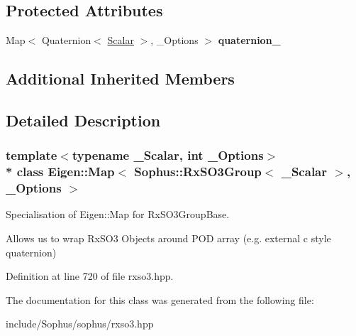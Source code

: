 \subsection*{Protected Attributes}
\begin{DoxyCompactItemize}
\item 
Map$<$ Quaternion$<$ \hyperlink{class_eigen_1_1_map_3_01_sophus_1_1_rx_s_o3_group_3_01___scalar_01_4_00_01___options_01_4_a7810f1290abcedb01ffc558ddef2484f}{Scalar} $>$, \+\_\+\+Options $>$ {\bfseries quaternion\+\_\+}\hypertarget{class_eigen_1_1_map_3_01_sophus_1_1_rx_s_o3_group_3_01___scalar_01_4_00_01___options_01_4_a39dc0a1f07c9aa8f4ac51dc4c5ae9634}{}\label{class_eigen_1_1_map_3_01_sophus_1_1_rx_s_o3_group_3_01___scalar_01_4_00_01___options_01_4_a39dc0a1f07c9aa8f4ac51dc4c5ae9634}

\end{DoxyCompactItemize}
\subsection*{Additional Inherited Members}


\subsection{Detailed Description}
\subsubsection*{template$<$typename \+\_\+\+Scalar, int \+\_\+\+Options$>$\\*
class Eigen\+::\+Map$<$ Sophus\+::\+Rx\+S\+O3\+Group$<$ \+\_\+\+Scalar $>$, \+\_\+\+Options $>$}

Specialisation of Eigen\+::\+Map for Rx\+S\+O3\+Group\+Base. 

Allows us to wrap Rx\+S\+O3 Objects around P\+OD array (e.\+g. external c style quaternion) 

Definition at line 720 of file rxso3.\+hpp.



The documentation for this class was generated from the following file\+:\begin{DoxyCompactItemize}
\item 
include/\+Sophus/sophus/rxso3.\+hpp\end{DoxyCompactItemize}
